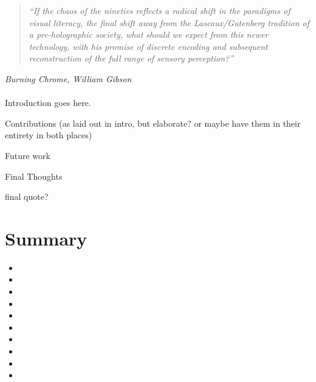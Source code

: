\begin{quote}
	\textit{``If the chaos of the nineties reflects a radical shift in the paradigms of visual literacy, the final shift away from the Lascaux/Gutenberg tradition of a pre-holographic society, what should we expect from this newer technology, with his promise of discrete encoding and subsequent reconstruction of the full range of sensory perception?''}
\end{quote}
\hfill \textit{Burning Chrome, William Gibson}
\\
\\


Introduction goes here.


Contributions (as laid out in intro, but elaborate? or maybe have them in their entirety in both places)


Future work


Final Thoughts

final quote?















\section{Summary}


\begin{itemize}
	\item 
	\item 
	\item 
	\item 
	\item 
	\item 
	\item 
	\item 
	\item 
	\item 
\end{itemize}


